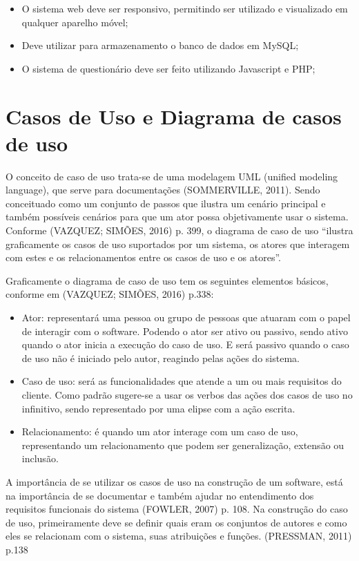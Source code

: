 \documentclass[
	12pt,				%
	openright,			%
	oneside,			%
	a4paper,			%
	english,			%
	french,				%
	spanish,			%
	brazil,				%
	]{abntex2}
\begin{document}
\begin{itemize}
\item O sistema web deve ser responsivo, permitindo ser utilizado e visualizado em qualquer aparelho móvel;
\item Deve utilizar para armazenamento o banco de dados em MySQL;
\item O sistema de questionário deve ser feito utilizando Javascript e PHP;
\end{itemize}

\section{Casos de Uso e Diagrama de casos de uso}

O conceito de caso de uso trata-se de uma modelagem UML (unified modeling language), que serve para documentações (SOMMERVILLE, 2011). Sendo conceituado como um conjunto de passos que ilustra um cenário principal e também possíveis cenários para que um ator possa objetivamente usar o sistema. Conforme (VAZQUEZ; SIMÕES, 2016) p. 399, o diagrama de caso de uso “ilustra graficamente os casos de uso suportados por um sistema, os atores que interagem com estes e os relacionamentos entre os casos de uso e os atores”.

Graficamente o diagrama de caso de uso tem os seguintes elementos básicos, conforme em (VAZQUEZ; SIMÕES, 2016) p.338:

\begin{itemize}
\item Ator: representará uma pessoa ou grupo de pessoas que atuaram com o papel de interagir com o software. Podendo o ator ser ativo ou passivo, sendo ativo quando o ator inicia a execução do caso de uso. E será passivo quando o caso de uso não é iniciado pelo autor, reagindo pelas ações do sistema.
\item Caso de uso: será as funcionalidades que atende a um ou mais requisitos do cliente. Como padrão sugere-se a usar os verbos das ações dos casos de uso no infinitivo, sendo representado por uma elipse com a ação escrita.
\item Relacionamento: é quando um ator interage com um caso de uso, representando um relacionamento que podem ser generalização, extensão ou inclusão.
\end{itemize}

A importância de se utilizar os casos de uso na construção de um software, está na importância de se documentar e também ajudar no entendimento dos requisitos funcionais do sistema (FOWLER, 2007) p. 108. Na construção do caso de uso, primeiramente deve se definir quais eram os conjuntos de autores e como eles se relacionam com o sistema, suas atribuições e funções. (PRESSMAN, 2011) p.138
\end{document}
